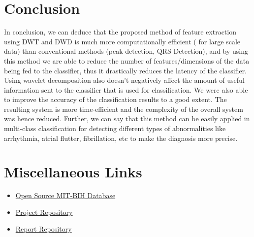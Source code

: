 \documentclass[10pt,twocolumn,letterpaper]{article}
\begin{document}
\section{Conclusion}
In conclusion, we can deduce that the proposed method of feature extraction using DWT and DWD is much more computationally efficient ( for large scale data) than conventional methods (peak detection, QRS Detection), and by using this method we are able to reduce the number of features/dimensions of the data being fed to the classifier, thus it drastically reduces the latency of the classifier.
Using wavelet decomposition also doesn’t negatively affect the amount of useful information sent to the classifier that is used for classification.
We were also able to improve the accuracy of the classification results to a good extent. The resulting system is more time-efficient and the complexity of the overall system was hence reduced.
Further, we can say that this method can be easily applied in multi-class classification for detecting different types of abnormalities like arrhythmia, atrial flutter, fibrillation, etc to make the diagnosis more precise.


{\small


}


\section*{Miscellaneous Links}
\begin{itemize}
    \item \href{https://physionet.org/content/mitdb/1.0.0/}{Open Source MIT-BIH Database}
    \item \href{https://github.com/abhishekkhare1998/EcgClassificationProject}{Project Repository}
    \item \href{https://github.com/abhishekkhare1998/EcgClassWaveletPaper}{Report Repository}
\end{itemize}
\end{document}
